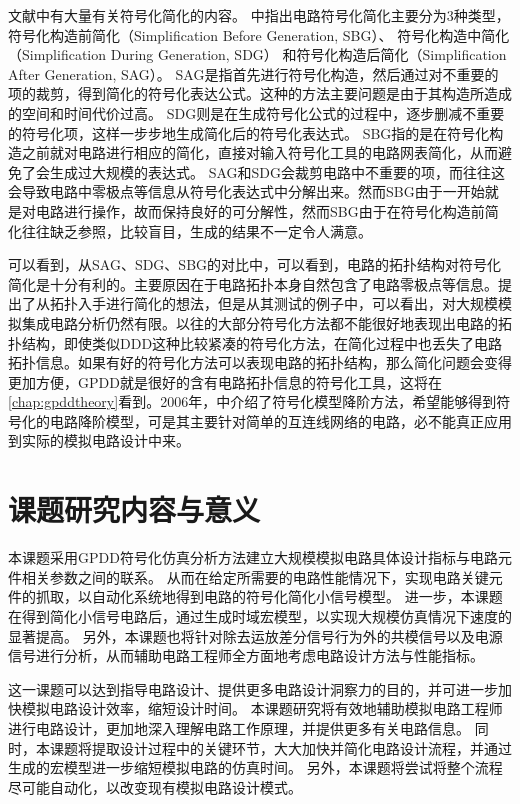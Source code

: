 文献中有大量有关符号化简化的内容。
\parencite{Gielen-Review-2002}中指出电路符号化简化主要分为3种类型，
符号化构造前简化（Simplification Before Generation, SBG）\parencite{Hsu-SBG-1994}、
符号化构造中简化（Simplification During Generation, SDG）\parencite{Fern-SDG-1994}
和符号化构造后简化（Simplification After Generation, SAG）\parencite{Gielen-ISAAC-1989,Sheldon-DDDSimp-1999}。
SAG是指首先进行符号化构造，然后通过对不重要的项的裁剪，得到简化的符号化表达公式。这种的方法主要问题是由于其构造所造成的空间和时间代价过高。
SDG则是在生成符号化公式的过程中，逐步删减不重要的符号化项，这样一步步地生成简化后的符号化表达式。
SBG指的是在符号化构造之前就对电路进行相应的简化，直接对输入符号化工具的电路网表简化，从而避免了会生成过大规模的表达式。
SAG和SDG会裁剪电路中不重要的项，而往往这会导致电路中零极点等信息从符号化表达式中分解出来。然而SBG由于一开始就是对电路进行操作，故而保持良好的可分解性，然而SBG由于在符号化构造前简化往往缺乏参照，比较盲目，生成的结果不一定令人满意。

可以看到，从SAG、SDG、SBG的对比中，可以看到，电路的拓扑结构对符号化简化是十分有利的。主要原因在于电路拓扑本身自然包含了电路零极点等信息。\parencite{Zivkovic-TopoSimp-1995}提出了从拓扑入手进行简化的想法，但是从其测试的例子中，可以看出，对大规模模拟集成电路分析仍然有限。以往的大部分符号化方法都不能很好地表现出电路的拓扑结构，即使类似DDD这种比较紧凑的符号化方法，在简化过程中也丢失了电路拓扑信息。如果有好的符号化方法可以表现电路的拓扑结构，那么简化问题会变得更加方便，GPDD就是很好的含有电路拓扑信息的符号化工具，这将在\ref{chap:gpddtheory}看到。2006年，\parencite{GShi-SMOR-2006}中介绍了符号化模型降阶方法，希望能够得到符号化的电路降阶模型，可是其主要针对简单的互连线网络的电路，必不能真正应用到实际的模拟电路设计中来。

\section{课题研究内容与意义}
\label{sec:intro:meaning}

本课题采用GPDD符号化仿真分析方法建立大规模模拟电路具体设计指标与电路元件相关参数之间的联系。
从而在给定所需要的电路性能情况下，实现电路关键元件的抓取，以自动化系统地得到电路的符号化简化小信号模型。
进一步，本课题在得到简化小信号电路后，通过生成时域宏模型，以实现大规模仿真情况下速度的显著提高。
另外，本课题也将针对除去运放差分信号行为外的共模信号以及电源信号进行分析，从而辅助电路工程师全方面地考虑电路设计方法与性能指标。

这一课题可以达到指导电路设计、提供更多电路设计洞察力的目的，并可进一步加快模拟电路设计效率，缩短设计时间。
本课题研究将有效地辅助模拟电路工程师进行电路设计，更加地深入理解电路工作原理，并提供更多有关电路信息。
同时，本课题将提取设计过程中的关键环节，大大加快并简化电路设计流程，并通过生成的宏模型进一步缩短模拟电路的仿真时间。
另外，本课题将尝试将整个流程尽可能自动化，以改变现有模拟电路设计模式。

